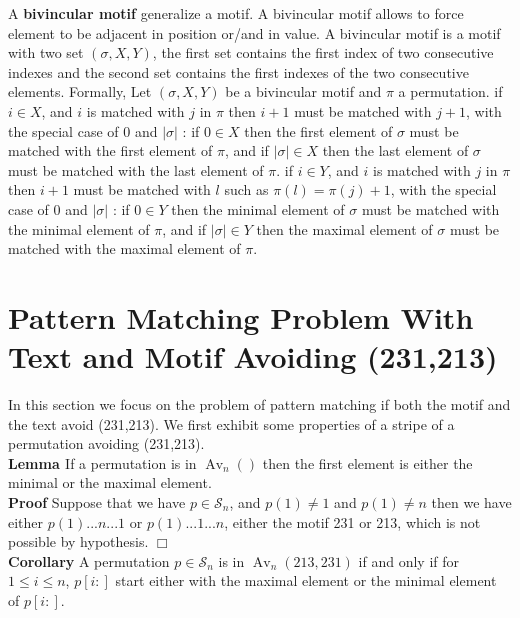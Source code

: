 \documentclass[a4paper]{llncs}
\DeclareMathOperator{\Avd}{Av}
\newcommand\Av[2]{\Avd_{{#1}}({#2})}
\newcommand{\Perm}[1]{\mathcal{S}_{#1}}
\newcommand{\ptext}{\pi}
\newcommand{\pmotif}{\sigma}
\newcommand{\x}{X}
\newcommand{\y}{Y}
\newcommand{\bmotif}{(\sigma,\x,\y)}
\newcounter{num}
\newcommand{\num}{\stepcounter{num} }
\newcommand{\numl}[1]{\refstepcounter{num}\label{#1}}
\begin{document}
		A \textbf{bivincular motif} generalize
		a motif. 
		A bivincular motif allows 
		to force element to be adjacent in position
		or/and in value.
		A bivincular motif
		is a motif with two set $\bmotif$,
		the first set contains the first index 
		of two consecutive indexes
		and the second set contains the first indexes
		of the two consecutive elements.
		Formally, Let $\bmotif$ 
		be a bivincular motif 
		and $\ptext$ a permutation.
		if $i \in \x$,
		and $i$ is matched with $j$ in $\ptext$
		then $i+1$ must be matched with $j+1$,
		with the special case of $0$ and $|\pmotif|$ :
		if $0 \in \x$ then the first element of $\pmotif$
		must be matched with the first element of $\ptext$,
		and if $|\pmotif| \in \x$ then the last element of $\pmotif$
		must be matched with the last element of $\ptext$.
		if $i \in \y$,
		and $i$ is matched with $j$ in $\ptext$
		then $i+1$ must be matched with $l$
		such as $\ptext(l)=\ptext(j)+1$,
		with the special case of $0$ and $|\pmotif|$ :
		if $0 \in \y$ then the minimal element of $\pmotif$
		must be matched with the minimal element of $\ptext$,
		and if $|\pmotif| \in \y$ then the maximal element of $\pmotif$
		must be matched with the maximal element of $\ptext$.		
			
	\section{Pattern Matching Problem With Text and Motif Avoiding (231,213)}

		In this section we focus 
		on the problem of pattern matching if
		both the motif and the text
		avoid (231,213).
		We first exhibit some properties of a stripe 
		of a permutation avoiding (231,213).\\

		\textbf{Lemma  \numl{firstelement} \thenum} If a permutation is in $\Av{n}{}$ 
		then the first element is either
		the minimal or the maximal element.\\
		
		\textbf{Proof} Suppose that we have
		$p \in \mathcal{S}_{n}$, and
		$p(1) \neq 1 $ and $p(1) \neq n$ then we have either
		$p(1) ... n ... 1$ or $p(1) ... 1 ... n $, either the motif 231 or 213, which is not possible by hypothesis. $\Box$\\
		
		\textbf{Corollary  \num \thenum} A permutation $p \in \Perm{n}$ is in $\Av{n}{213,231}$ if and only if for $1 \leq i \leq n$, 
		$p[i:]$ start either with the maximal element
		or the minimal element of $p[i:]$.\\
	
\end{document}
